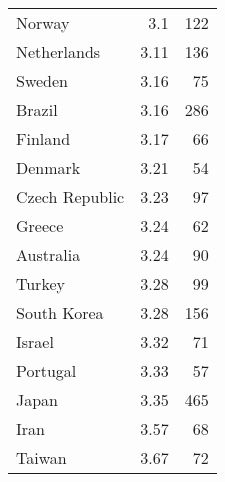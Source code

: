 \documentclass[12pt]{article} %
\begin{document}
\begin{table}[]
\begin{tabular}{lrr}
Norway           & 3.1              & 122                       \\
Netherlands      & 3.11             & 136                       \\
Sweden           & 3.16             & 75                        \\
Brazil           & 3.16             & 286                       \\
Finland          & 3.17             & 66                        \\
Denmark          & 3.21             & 54                        \\
Czech Republic   & 3.23             & 97                        \\
Greece           & 3.24             & 62                        \\
Australia        & 3.24             & 90                        \\
Turkey           & 3.28             & 99                        \\
South Korea      & 3.28             & 156                       \\
Israel           & 3.32             & 71                        \\
Portugal         & 3.33             & 57                        \\
Japan            & 3.35             & 465                       \\
Iran             & 3.57             & 68                        \\
Taiwan           & 3.67             & 72
\end{tabular}
\end{table}
\end{document}
